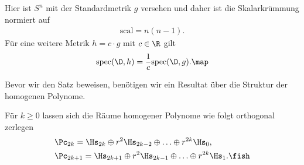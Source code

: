 \documentclass[%
	paper=a5,%
	fleqn,%
	DIV=18,%
	BCOR=0mm,
	fontsize=11pt,
	titlepage=false,%
	bibliography=totoc,
	DIV=18,%
	twoside=true,
	pdftitle=Riemannsche Geometrie,
	pdfauthor=Uwe Semmelmann,
	numbers=noendperiod]%
	{scrbook}
\begin{document}
\newcommand{\scal}{\mathrm{scal}}
\newcommand{\spec}{\mathrm{spec}}

\begin{rem}
Hier ist $S^n$ mit der Standardmetrik $g$ versehen und daher ist die Skalarkrümmung normiert auf
\begin{align*}
\scal = n(n-1).
\end{align*}
Für eine weitere Metrik $h=c\cdot g$ mit $c\in\R$ gilt
\begin{align*}
\spec(\D,h) = \frac{1}{c}\spec(\D,g).\map
\end{align*}
\end{rem}

Bevor wir den Satz beweisen, benötigen wir ein Resultat über die Struktur der homogenen Polynome.

\begin{lem}
Für $k\ge 0$ lassen sich die Räume homogener Polynome wie folgt orthogonal zerlegen
\begin{align*}
&\Pc_{2k} = \Hs_{2k}\oplus r^2 \Hs_{2k-2} \oplus \ldots \oplus r^{2k} \Hs_{0},\\
&\Pc_{2k+1} = \Hs_{2k+1}\oplus r^2 \Hs_{2k-1} \oplus \ldots \oplus r^{2k}\Hs_{1}.\fish
\end{align*}
\end{lem}
\end{document}

